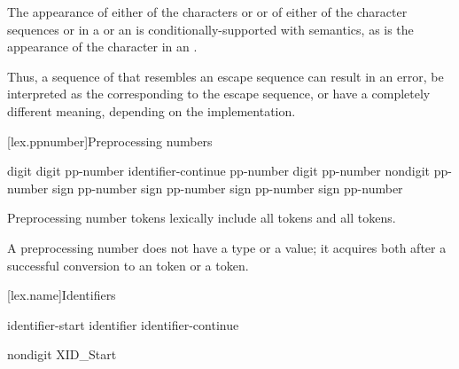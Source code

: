 \documentclass{wg21}
\begin{document}
\pnum
The appearance of either of the characters  or \tcode{\textbackslash} or of
either of the character sequences \tcode{/*} or \tcode{//} in a
 or an 
is conditionally-supported with  semantics, as is the appearance of the character
 in an .
\begin{wfootnote}
    Thus, a sequence of 
    that resembles an escape sequence can result in an error, be interpreted as the
     corresponding to the escape sequence, or have a completely different meaning,
    depending on the implementation.
\end{wfootnote}

[lex.ppnumber]{Preprocessing numbers}

%
\begin{bnf}
    \br
    digit\br
     digit\br
    pp-number identifier-continue\br
    pp-number  digit\br
    pp-number  nondigit\br
    pp-number  sign\br
    pp-number  sign\br
    pp-number  sign\br
    pp-number  sign\br
    pp-number 
\end{bnf}

\pnum
Preprocessing number tokens lexically include
all  tokens and
all  tokens.

\pnum
A preprocessing number does not have a type or a value; it acquires both
after a successful conversion to
an  token or
a  token.%

[lex.name]{Identifiers}

%
\begin{bnf}
    \br
    identifier-start\br
    identifier identifier-continue
\end{bnf}

\begin{bnf}
    \br
    nondigit\br
    \textnormal{ XID_Start}
\end{bnf}
\end{document}
